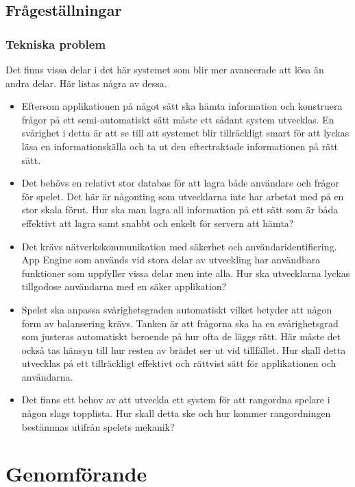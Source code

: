 \documentclass[a4paper, 11pt]{article}
\begin{document}
\subsection{Frågeställningar}

\subsubsection{Tekniska problem}
Det finns vissa delar i det här systemet som blir mer avancerade att lösa än andra delar. Här listas några av dessa.
\begin{itemize}
\item Eftersom applikationen på något sätt ska hämta information och konstruera frågor på ett semi-automatiskt sätt måste ett sådant system utvecklas. En svårighet i detta är att se till att systemet blir tillräckligt smart för att lyckas läsa en informationskälla och ta ut den eftertraktade informationen på rätt sätt.
\item Det behövs en relativt stor databas för att lagra både användare och frågor för spelet. Det här är någonting som utvecklarna inte har arbetat med på en stor skala förut. Hur ska man lagra all information på ett sätt som är båda effektivt att lagra samt snabbt och enkelt för servern att hämta?
\item Det krävs nätverkskommunikation med säkerhet och användaridentifiering. App Engine som används vid stora delar av utveckling har användbara funktioner som uppfyller vissa delar men inte alla. Hur ska utvecklarna lyckas tillgodose användarna med en säker applikation?
\item Spelet ska anpassa svårighetsgraden automatiskt vilket betyder att någon form av balansering krävs. Tanken är att frågorna ska ha en svårighetsgrad som justeras automatiskt beroende på hur ofta de läggs rätt. Här måste det också tas hänsyn till hur resten av brädet ser ut vid tillfället. Hur skall detta utvecklas på ett tillräckligt effektivt och rättvist sätt för applikationen och användarna.
\item Det finns ett behov av att utveckla ett system för att rangordna spelare i någon slags topplista. Hur skall detta ske och hur kommer rangordningen bestämmas utifrån spelets mekanik? 
\end{itemize}

\section{Genomförande}
\end{document}
